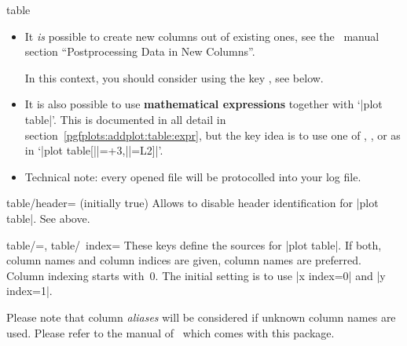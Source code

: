 \begin{addplotoperation}[]{table}{}
\begin{itemize}
	\item It \emph{is} possible to create new columns out of existing ones, see the \PGFPlotstable\ manual section ``Postprocessing Data in New Columns''.

	In this context, you should consider using the key , see below.
	\item It is also possible to use \textbf{mathematical expressions} together with `|plot table|'. This is documented in all detail in section~\ref{pgfplots:addplot:table:expr}, but the key idea is to use one of , ,  or  as in `|plot table[||=+3,||=L2]|'.
	\item Technical note: every opened file will be protocolled into your log file.
\end{itemize}
\end{addplotoperation}

\begin{pgfplotskey}{table/header= (initially true)}
	Allows to disable header identification for |plot table|. See above.
\end{pgfplotskey}
\begin{pgfplotsxykeylist}{table/\x=,
	table/\x\ index=}
	These keys define the sources for |plot table|. If both, column names and column indices are given, column names are preferred. Column indexing starts with~$0$. The initial setting is to use |x index=0| and |y index=1|. 

	Please note that column \emph{aliases} will be considered if unknown column names are used. Please refer to the manual of \PGFPlotstable\ which comes with this package.
\end{pgfplotsxykeylist}

